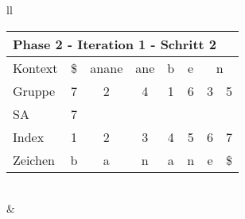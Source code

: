 \begin{table}[H]
\begin{adjustbox}{max width=\textwidth}
\begin{tabular}{ll}
\begin{tabular}{lccccccc}
\multicolumn{8}{l}{Phase 2 - Iteration 1 - Schritt 2}                                                                                                                                                                     \\ \hline
\multicolumn{1}{l|}{Kontext} & \multicolumn{1}{c|}{\cellcolor[HTML]{\green}\$} & \multicolumn{1}{c|}{anane} & \multicolumn{1}{c|}{ane} & \multicolumn{1}{c|}{b} & \multicolumn{1}{c|}{e} & \multicolumn{2}{c}{n}    \\
\multicolumn{1}{l|}{Gruppe}  & \multicolumn{1}{c|}{\cellcolor[HTML]{\green}7}  & \multicolumn{1}{c|}{2}     & \multicolumn{1}{c|}{4}   & \multicolumn{1}{c|}{1} & \multicolumn{1}{c|}{6} & 3 & 5                          \\ 
\multicolumn{1}{l|}{SA}      & \multicolumn{1}{c|}{\cellcolor[HTML]{\green}7}  & \multicolumn{1}{c|}{}      & \multicolumn{1}{c|}{}    & \multicolumn{1}{c|}{}  & \multicolumn{1}{c|}{}  &   &                            \\ \hline
\multicolumn{1}{l|}{Index}   & 1                                               & 2                          & 3                        & 4                      & 5                      & 6 & \cellcolor[HTML]{\green}7  \\
\multicolumn{1}{l|}{Zeichen} & b                                               & a                          & n                        & a                      & n                      & e & \cellcolor[HTML]{\green}\$
\end{tabular}

\\
&
\\


\end{tabular}
\end{adjustbox}
\end{table}
